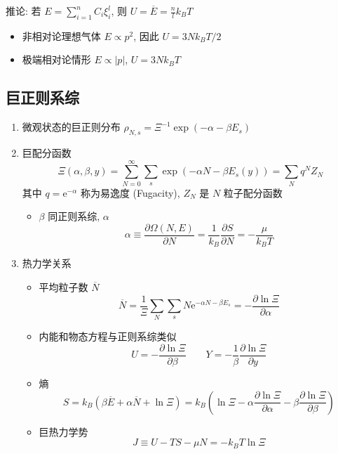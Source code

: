\documentclass[12pt,a4paper]{article}%
\numberwithin{equation}{section}
\newcommand\e{\mathrm{e}}%
\begin{document}
推论: 若 $\displaystyle E = \sum_{i=1}^nC_i\xi_i^l$, 则 $\displaystyle U = \overline E = \frac nl k_BT$
\begin{itemize}
    \item 非相对论理想气体 $E\propto p^2$, 因此 $U = 3Nk_BT/2$
    \item 极端相对论情形 $E\propto |p|$, $U = 3Nk_BT$
\end{itemize}
\subsection{巨正则系综} %
\label{sub:grand_canonical}
\begin{enumerate}
    \item 微观状态的巨正则分布 $\rho_{N,s} = \Xi^{-1}\exp(-\alpha-\beta E_s)$
    \item 巨配分函数
    \begin{equation}
        \Xi(\alpha,\beta, y) = \sum_{N=0}^\infty\sum_s\exp\left(-\alpha N - \beta E_s(y)\right)
         = \sum_N q^NZ_N
    \end{equation}
    其中 $q = \e^{-\alpha}$ 称为易逸度 (Fugacity), $Z_N$ 是 $N$ 粒子配分函数
    \begin{itemize}
        \item $\beta$ 同正则系综, $\alpha$
        \begin{equation}
            \alpha \equiv \frac{\partial \Omega(N,E)}{\partial N}
             = \frac 1{k_B}\frac{\partial S}{\partial N} = -\frac{\mu}{k_B T}
        \end{equation}
    \end{itemize}
    \item 热力学关系
    \begin{itemize}
        \item 平均粒子数 $\overline N$
        \begin{equation}
            \overline N = \frac 1\Xi\sum_N\sum_s N\e^{-\alpha N-\beta E_s} 
             = -\frac{\partial\ln\Xi}{\partial\alpha}
        \end{equation}
        \item 内能和物态方程与正则系综类似
        \begin{equation}
            U = -\frac{\partial\ln\Xi}{\partial\beta}\qquad
            Y = -\frac1\beta \frac{\partial\ln \Xi}{\partial y}
        \end{equation}
        \item 熵
        \begin{equation}
            S = k_B(\beta\overline E + \alpha\overline N + \ln\Xi) 
            = k_B\left(\ln\Xi - \alpha\frac{\partial\ln\Xi}{\partial\alpha} - \beta\frac{\partial\ln\Xi}{\partial\beta}\right)
        \end{equation}
        \item 巨热力学势
        \begin{equation}
            J \equiv U-TS-\mu N = -k_B T\ln\Xi
        \end{equation}
    \end{itemize}
\end{enumerate}
\end{document}
